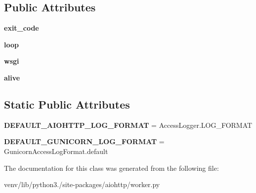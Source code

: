 \subsection*{Public Attributes}
\begin{DoxyCompactItemize}
\item 
\mbox{\label{classaiohttp_1_1worker_1_1_gunicorn_web_worker_ab7033ab17142a8d8ea1c1330ab0a4b79}} 
{\bfseries exit\+\_\+code}
\item 
\mbox{\label{classaiohttp_1_1worker_1_1_gunicorn_web_worker_a32d237dd93e9dd193dfd9462d590fc8f}} 
{\bfseries loop}
\item 
\mbox{\label{classaiohttp_1_1worker_1_1_gunicorn_web_worker_aa6edad73eba6d85ac1cc44be676c1d05}} 
{\bfseries wsgi}
\item 
\mbox{\label{classaiohttp_1_1worker_1_1_gunicorn_web_worker_a30ceda5f61adca6c517eb5f061ee0e86}} 
{\bfseries alive}
\end{DoxyCompactItemize}
\subsection*{Static Public Attributes}
\begin{DoxyCompactItemize}
\item 
\mbox{\label{classaiohttp_1_1worker_1_1_gunicorn_web_worker_a995ed869798e9cf09b2067b4ccb2c99e}} 
{\bfseries D\+E\+F\+A\+U\+L\+T\+\_\+\+A\+I\+O\+H\+T\+T\+P\+\_\+\+L\+O\+G\+\_\+\+F\+O\+R\+M\+AT} = Access\+Logger.\+L\+O\+G\+\_\+\+F\+O\+R\+M\+AT
\item 
\mbox{\label{classaiohttp_1_1worker_1_1_gunicorn_web_worker_a55ecddbaec75ae55df3e2d4cc6b1dcfa}} 
{\bfseries D\+E\+F\+A\+U\+L\+T\+\_\+\+G\+U\+N\+I\+C\+O\+R\+N\+\_\+\+L\+O\+G\+\_\+\+F\+O\+R\+M\+AT} = Gunicorn\+Access\+Log\+Format.\+default
\end{DoxyCompactItemize}


The documentation for this class was generated from the following file\+:\begin{DoxyCompactItemize}
\item 
venv/lib/python3./site-\/packages/aiohttp/worker.\+py\end{DoxyCompactItemize}
